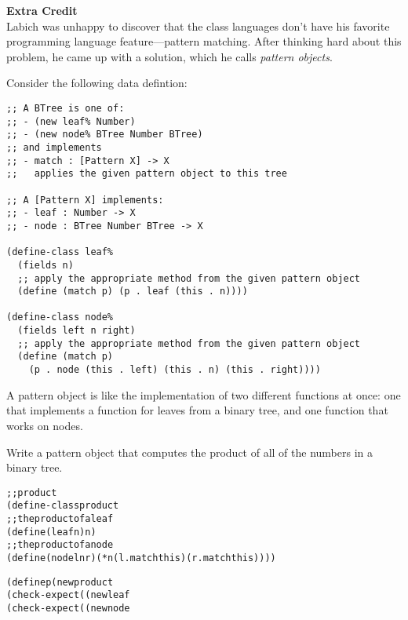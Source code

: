 \documentclass[12pt]{article}                   %
\def\pts#1{\marginpar{\footnotesize \raggedright  \fbox{#1 {\sc Points}}}}
\newenvironment{solution}{\color{Red}}{}
\begin{document}
\begin{problem}\pts{5}


\textbf{Extra Credit}
\\
\noindent
Labich was unhappy to discover that the class languages don't have his
favorite programming language feature---pattern matching.  After
thinking hard about this problem, he came up with a solution, which he
calls \emph{pattern objects}.  

Consider the following data defintion:
\begin{verbatim}
;; A BTree is one of:
;; - (new leaf% Number)
;; - (new node% BTree Number BTree)
;; and implements
;; - match : [Pattern X] -> X
;;   applies the given pattern object to this tree

;; A [Pattern X] implements:
;; - leaf : Number -> X
;; - node : BTree Number BTree -> X

(define-class leaf%
  (fields n)
  ;; apply the appropriate method from the given pattern object
  (define (match p) (p . leaf (this . n))))

(define-class node%
  (fields left n right)
  ;; apply the appropriate method from the given pattern object
  (define (match p) 
    (p . node (this . left) (this . n) (this . right))))
\end{verbatim}

A pattern object is like the implementation of two different functions
at once: one that implements a function for leaves from a binary tree,
and one function that works on nodes.

Write a pattern object that computes the product of all of the numbers
in a binary tree.

\ifrubric\else
{}
\fi


\begin{solution}
\begin{alltt}
;; product% implements [Pattern Number]
(define-class product%
  ;; the product of a leaf
  (define (leaf n) n)
  ;; the product of a node
  (define (node l n r) (* n (l . match this) (r . match this))))

(define p (new product%))
(check-expect ((new leaf% 5) . match p) 5)
(check-expect ((new node%  (new leaf% 2) 5 (new leaf% 7)) . match p) 70)
\end{alltt}
\end{solution}
\end{problem}
\end{document}
